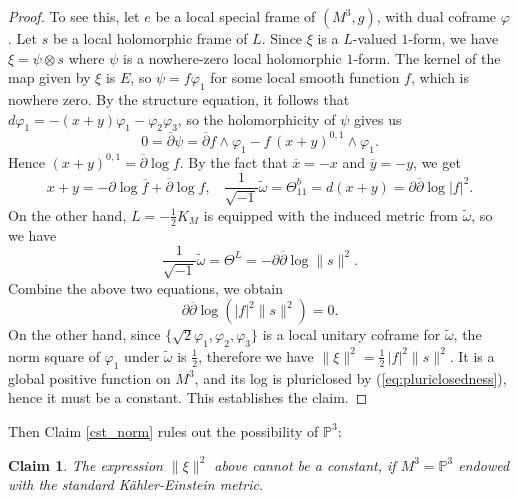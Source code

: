 \documentclass{amsart}
\numberwithin{equation}{section}
\newtheorem{claim}  [theorem]     {Claim}
\theoremstyle{definition}
\renewcommand{\1}{\mathds{1}}
\renewcommand{\>}{\rightarrow}
\begin{document}
\begin{proof}
To see this, let $e$ be a local special frame of $(M^3,g)$, with dual coframe $\varphi$. Let $s$ be a local holomorphic frame of $L$. Since $\xi$ is a $L$-valued $1$-form, we have $\xi = \psi \otimes s$ where $\psi$ is a nowhere-zero local holomorphic $1$-form. The kernel of the map given by $\xi$ is $E$, so $\psi = f\varphi_1$ for some local smooth function $f$, which is nowhere zero. By the structure equation, it follows that $d\varphi_1=-(x+y)\varphi_1 - \varphi_2\varphi_3$, so the holomorphicity of $\psi$ gives us
$$ 0 = \overline{\partial} \psi =  \overline{\partial}f \wedge \varphi_1 - f \,(x+y)^{0,1}\wedge \varphi_1. $$
Hence $(x+y)^{0,1}=\overline{\partial}\log f$. By the fact that $\overline{x}=-x$ and $\overline{y}=-y$, we get
$$ x+y = - \partial \log \overline{f} + \overline{\partial}\log f, \ \ \ \  \frac{1}{\sqrt{-1}}\tilde{\omega} = \Theta^b_{11} = d(x+y) = \partial \overline{\partial}\log |f|^2. $$
On the other hand,  $L=-\frac{1}{2}K_{\!M}$ is equipped with the induced metric from $\tilde{\omega}$, so we have
$$ \frac{1}{\sqrt{-1}} \tilde{\omega} = \Theta^L = - \partial \overline{\partial}\log \parallel \!\!s\!\!\parallel ^2. $$
Combine the above two equations, we obtain
\begin{equation} \label{eq:pluriclosedness}
 \partial \overline{\partial}\log (|f|^2 \!\parallel\!\!s\!\!\parallel^2) = 0.
 \end{equation}
On the other hand, since $\{ \sqrt{2} \varphi_1, \varphi_2, \varphi_3\}$ is a local unitary coframe for $\tilde{\omega}$, the norm square of $\varphi_1$ under $\tilde{\omega}$ is $\frac{1}{2}$, therefore we have
$ \parallel\!\!\xi\!\!\parallel^2=\frac{1}{2}\,|f|^2\parallel\!\!s\!\!\parallel^2$.
It is a global positive function on $M^3$, and its log is pluriclosed by (\ref{eq:pluriclosedness}), hence it must be a constant. This establishes the claim.
\end{proof}

Then Claim \ref{cst_norm} rules out the possibility of ${\mathbb P}^3$:
\begin{claim}
The expression $\|\xi\|^2$ above cannot be a constant, if $M^3={\mathbb P}^3$ endowed with the standard K\"ahler-Einstein metric.
\end{claim}
\end{document}
